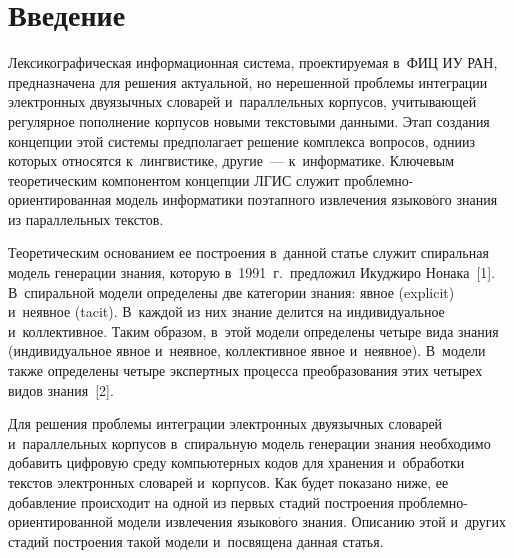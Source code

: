   

  



\thispagestyle{headings}

\begin{multicols}{2}

\label{st\stat}

\section{Введение}

  Лексикографическая информационная система, проектируемая в~ФИЦ ИУ 
РАН, предназначена для решения актуальной, но нерешенной проб\-ле\-мы 
интеграции электронных двуязычных словарей и~параллельных корпусов, 
учитывающей регулярное пополнение корпусов новыми текс\-то\-вы\-ми данными. 
Этап создания концепции этой сис\-те\-мы предполагает решение комплекса 
вопросов, одни\linebreak из которых относятся к~лингвистике, другие~--- 
к~информатике. Ключевым тео\-ре\-ти\-че\-ским компонентом концепции 
ЛГИС служит  
проб\-лем\-но-ори\-ен\-ти\-ро\-ван\-ная модель информатики поэтапного\linebreak 
\mbox{извлечения} языков$\acute{\mbox{о}}$го знания из параллельных текс\-тов.
  
  Теоретическим основанием ее по\-стро\-ения в~данной статье служит 
спиральная модель генерации знания, которую в~1991~г.\ предложил Икуджиро 
Нонака~[1]. В~спиральной модели определены две категории знания: явное 
(explicit) и~неявное (tacit). В~каж\-дой из них знание делится на индивидуальное 
и~коллективное. Таким образом, в~этой модели определены четыре вида знания 
(индивидуальное явное и~неявное, коллективное явное и~неявное). В~модели 
также определены четыре экспертных процесса преобразования этих четырех 
видов знания~[2].
  
  Для решения проблемы интеграции электронных двуязычных словарей 
и~параллельных корпусов в~спиральную модель генерации знания необходимо 
добавить циф\-ро\-вую среду компьютерных кодов для хранения и~обработки 
текстов электронных словарей и~корпусов. Как будет показано ниже, ее 
добавление происходит на одной из первых стадий построения  
проб\-лем\-но-ори\-ен\-ти\-ро\-ван\-ной модели извлечения 
языков$\acute{\mbox{о}}$го знания. Описанию этой и~других стадий 
по\-стро\-ения такой модели и~посвящена данная статья.


\end{multicols}
